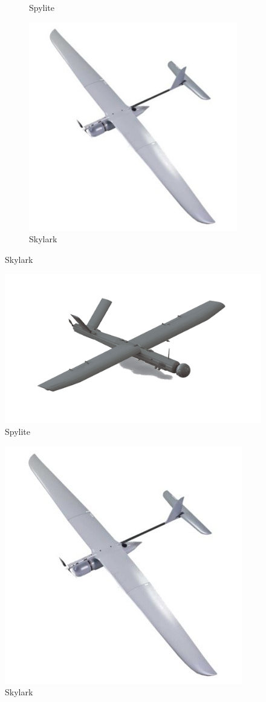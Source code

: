 \documentclass[12 pt]{article}
\begin{document}
\begin{figure}[h!]
\begin{subfigure}{.4\textwidth}
        \caption{Spylite}
    \end{subfigure}
    \centering
    \begin{subfigure}{.4\textwidth}
        \centering
        \includegraphics[width = 0.8\linewidth]{Aircraft pics/Skylark.jpg}
        \caption{Skylark}
    \end{subfigure}
\end{figure}

\vspace{\fill}

\newpage


\begin{figure}[h]
    \centering
    \includegraphics[width=0.5\linewidth]{Aircraft pics/spylite.png}
    \caption{Spylite}
    \label{fig:enter-label}
\end{figure}

\begin{figure}[h]
    \centering
    \includegraphics[width=0.3\linewidth]{Aircraft pics/Skylark.jpg}
    \caption{Skylark}
    \label{fig:enter-label}
\end{figure}
\end{document}
